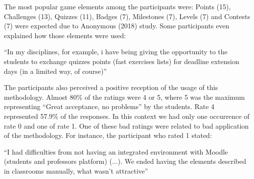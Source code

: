 The most popular game elements among the participants were: Points (15), Challenges (13), Quizzes (11), Badges (7), Milestones (7), Levels (7) and Contests (7) were expected due to Anonymous (2018) study. Some participants even explained how those elements were used: 

“In my disciplines, for example, i have being giving the opportunity to the students to exchange quizzes points (fast exercises lists) for deadline extension days (in a limited way, of course)”

The participants also perceived a positive reception of the usage of this methodology. Almost 80\% of the ratings were 4 or 5, where 5 was the maximum representing “Great acceptance, no problems” by the students. Rate 4 represented 57.9\% of the responses. In this context we had only one occurrence of rate 0 and one of rate 1. One of these bad ratings were related to bad application of the methodology. For instance, the participant who rated 1 stated:

“I had difficulties from not having an integrated environment with Moodle (students and professors platform) (...). We ended having the elements described in classrooms manually, what wasn’t attractive”

